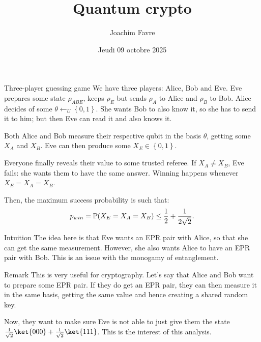 \documentclass[a4paper]{article}
\title{Quantum crypto}
\author{Joachim Favre}
\date{Jeudi 09 octobre 2025}
\begin{document}
\maketitle


\begin{parag}{Three-player guessing game}
    We have three players: Alice, Bob and Eve. Eve prepares some state $\rho_{ABE}$, keeps $\rho_E$ but sends $\rho_A$ to Alice and $\rho_B$ to Bob. Alice decides of some $\theta \leftarrow_U \left\{0, 1\right\}$. She wants Bob to also know it, so she has to send it to him; but then Eve can read it and also knows it.

    Both Alice and Bob measure their respective qubit in the basis $\theta$, getting some $X_A$ and $X_B$. Eve can then produce some $X_E \in \left\{0, 1\right\}$.

    Everyone finally reveals their value to some trusted referee. If $X_A \neq X_B$, Eve fails: she wants them to have the same answer. Winning happens whenever $X_E = X_A = X_B$.

    Then, the maximum success probability is such that: 
    \[p_{win} = \prob\left(X_E = X_A = X_B\right) \leq \frac{1}{2} + \frac{1}{2 \sqrt{2}}.\]

    \begin{subparag}{Intuition}
        The idea here is that Eve wants an EPR pair with Alice, so that she can get the same measurement. However, she also wants Alice to have an EPR pair with Bob. This is an issue with the monogamy of entanglement.
    \end{subparag}

    \begin{subparag}{Remark}
        This is very useful for cryptography. Let's say that Alice and Bob want to prepare some EPR pair. If they do get an EPR pair, they can then measure it in the same basis, getting the same value and hence creating a shared random key.

        Now, they want to make sure Eve is not able to just give them the state $\frac{1}{\sqrt{2}} \ket{000} + \frac{1}{\sqrt{2}} \ket{111}$. This is the interest of this analysis.
    \end{subparag}


\end{parag}
\end{document}
